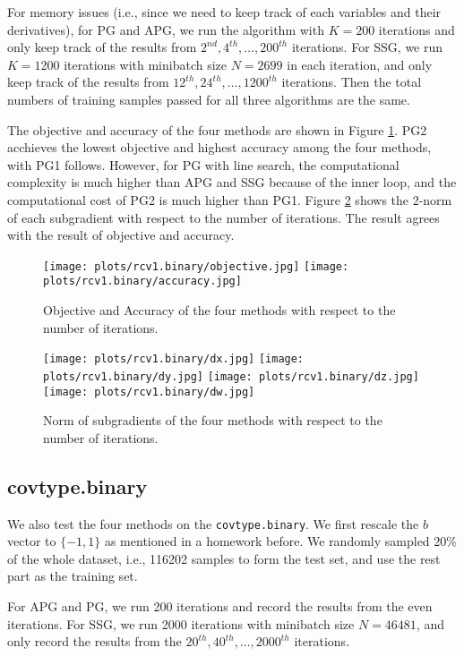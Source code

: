 \documentclass{article}
\numberwithin{equation}{section}
\numberwithin{figure}{section}
\begin{document}
For memory issues (i.e., since we need to keep track of each variables and their derivatives), for PG and APG, we run the algorithm with $K = 200$ iterations and only keep track of the results from $2^{nd}, 4^{th}, \hdots, 200^{th} $ iterations. For SSG, we run $K = 1200$ iterations with minibatch size $N = 2699$ in each iteration, and only keep track of the results from $12^{th}, 24^{th}, \hdots, 1200^{th} $ iterations. Then the total numbers of training samples passed for all three algorithms are the same.

The objective and accuracy of the four methods are shown in Figure \ref{rc1.binary-obj-acc}. PG2 acchieves the lowest objective and highest accuracy among the four methods, with PG1 follows. However, for PG with line search, the computational complexity is much higher than APG and SSG because of the inner loop, and the computational cost of PG2 is much higher than PG1. Figure \ref{rc1.binary-subgradient} shows the 2-norm of each subgradient with respect to the number of iterations. The result agrees with the result of objective and accuracy.

\begin{figure}[h]
\centering
\vbox{
	\texttt{[image: plots/rcv1.binary/objective.jpg]}
	\texttt{[image: plots/rcv1.binary/accuracy.jpg]}
}
\caption{Objective and Accuracy of the four methods with respect to the number of iterations.}
\label{rc1.binary-obj-acc}
\end{figure}

\begin{figure}[h]
\centering
\vbox{
	\texttt{[image: plots/rcv1.binary/dx.jpg]}
	\texttt{[image: plots/rcv1.binary/dy.jpg]}
} 
\vbox{
	\texttt{[image: plots/rcv1.binary/dz.jpg]}
	\texttt{[image: plots/rcv1.binary/dw.jpg]}
}
\caption{Norm of subgradients of the four methods with respect to the number of iterations.}
\label{rc1.binary-subgradient}
\end{figure}

\subsection{covtype.binary}

We also test the four methods on the \texttt{covtype.binary}. We first rescale the $b$ vector to $\{-1, 1\}$ as mentioned in a homework before. We randomly sampled $20\%$ of the whole dataset, i.e., 116202 samples to form the test set, and use the rest part as the training set.

For APG and PG, we run 200 iterations and record the results from the even iterations. For SSG, we run 2000 iterations with minibatch size $N = 46481$, and only record the results from the $20^{th}, 40^{th}, \hdots, 2000^{th} $ iterations.
\end{document}

